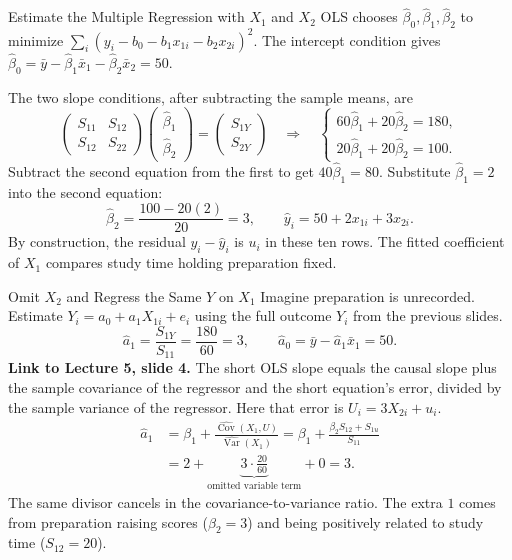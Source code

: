 \documentclass[10pt,aspectratio=169]{beamer}
\newcommand{\Cov}{\operatorname{Cov}}
\newcommand{\Var}{\operatorname{Var}}
\begin{document}
\begin{frame}{Estimate the Multiple Regression with $X_1$ and $X_2$}
OLS chooses $\hat\beta_0,\hat\beta_1,\hat\beta_2$ to minimize
$\sum_i(y_i-b_0-b_1x_{1i}-b_2x_{2i})^2$. The intercept condition gives
$\hat\beta_0=\bar y-\hat\beta_1\bar x_1-\hat\beta_2\bar x_2=50$.
\medskip

The two slope conditions, after subtracting the sample means, are
\[
\begin{pmatrix}S_{11}&S_{12}\\ S_{12}&S_{22}\end{pmatrix}
\begin{pmatrix}\hat\beta_1\\ \hat\beta_2\end{pmatrix}
=\begin{pmatrix}S_{1Y}\\ S_{2Y}\end{pmatrix}
\quad\Rightarrow\quad
\begin{cases}
60\hat\beta_1+20\hat\beta_2=180,\\
20\hat\beta_1+20\hat\beta_2=100.
\end{cases}
\]
Subtract the second equation from the first to get $40\hat\beta_1=80$. Substitute $\hat\beta_1=2$ into the second equation:
\[
\hat\beta_2=\frac{100-20(2)}{20}=3,
\qquad \boxed{\hat y_i=50+2x_{1i}+3x_{2i}.}
\]
By construction, the residual $y_i-\hat y_i$ is $u_i$ in these ten rows. The fitted coefficient of $X_1$ compares study time holding preparation fixed.
\end{frame}

\begin{frame}{Omit $X_2$ and Regress the Same $Y$ on $X_1$}
Imagine preparation is unrecorded. Estimate $Y_i=a_0+a_1X_{1i}+e_i$ using the full outcome $Y_i$ from the previous slides.
\[
\hat a_1=\frac{S_{1Y}}{S_{11}}=\frac{180}{60}=3,\qquad
\hat a_0=\bar y-\hat a_1\bar x_1=50.
\]
\textbf{Link to Lecture 5, slide 4.} The short OLS slope equals the causal slope plus the sample covariance of the regressor and the short equation's error, divided by the sample variance of the regressor. Here that error is $U_i=3X_{2i}+u_i$.
\[
\begin{aligned}
\hat a_1
&=\beta_1+\frac{\widehat{\Cov}(X_1,U)}{\widehat{\Var}(X_1)}
=\beta_1+\frac{\beta_2 S_{12}+S_{1u}}{S_{11}}\\
&=2+\underbrace{3\cdot\frac{20}{60}}_{\text{omitted variable term}}+0
=\boxed{3}.
\end{aligned}
\]
The same divisor cancels in the covariance-to-variance ratio. The extra $1$ comes from preparation raising scores ($\beta_2=3$) and being positively related to study time ($S_{12}=20$).
\end{frame}
\end{document}

